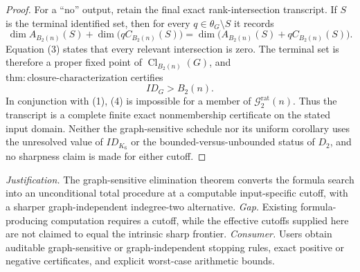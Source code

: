 \documentclass{article}
\begin{document}
\begin{proof}
For a ``no'' output, retain the final exact rank-intersection transcript.  If \(S\) is the terminal identified set, then for every \(q\in\theta_G\setminus S\) it records
\[
 \dim A_{B_2(n)}(S)
 +\dim\bigl(qC_{B_2(n)}(S)\bigr)
 =\dim\bigl(A_{B_2(n)}(S)+qC_{B_2(n)}(S)\bigr).
 \tag{3}
\]
Equation (3) states that every relevant intersection is zero.  The terminal set is therefore a proper fixed point of \(\operatorname{Cl}_{B_2(n)}(G)\), and \(\mathrm{thm:closure\mbox{-}characterization}\) certifies
\[
 ID_G>B_2(n).
 \tag{4}
\]
In conjunction with (1), (4) is impossible for a member of \(\mathcal G_{2}^{\mathrm{rat}}(n)\).  Thus the transcript is a complete finite exact nonmembership certificate on the stated input domain.  Neither the graph-sensitive schedule nor its uniform corollary uses the unresolved value of \(ID_{K_6}\) or the bounded-versus-unbounded status of \(D_2\), and no sharpness claim is made for either cutoff.
\end{proof}
\par\smallskip\noindent \textit{Justification.} The graph-sensitive elimination theorem converts the formula search into an unconditional total procedure at a computable input-specific cutoff, with a sharper graph-independent indegree-two alternative. \textit{Gap.} Existing formula-producing computation requires a cutoff, while the effective cutoffs supplied here are not claimed to equal the intrinsic sharp frontier. \textit{Consumer.} Users obtain auditable graph-sensitive or graph-independent stopping rules, exact positive or negative certificates, and explicit worst-case arithmetic bounds.
\end{document}
